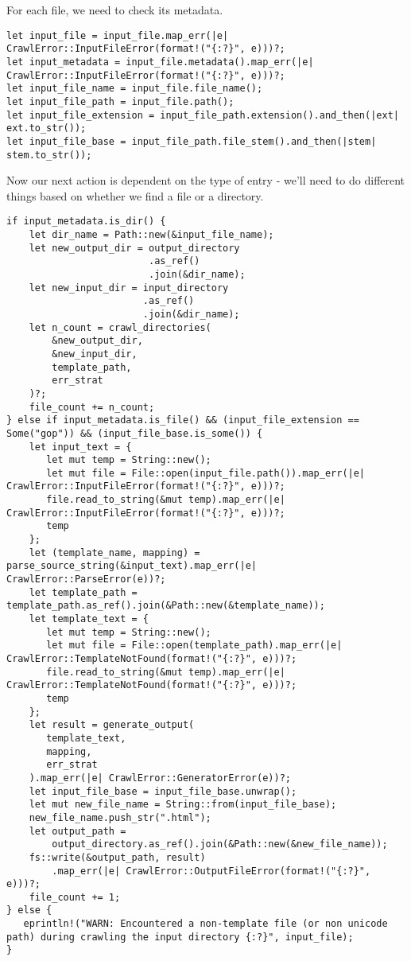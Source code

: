 \documentclass[11pt]{article}
\begin{document}
For each file, we need to check its metadata.
\begin{verbatim}
let input_file = input_file.map_err(|e| CrawlError::InputFileError(format!("{:?}", e)))?;
let input_metadata = input_file.metadata().map_err(|e| CrawlError::InputFileError(format!("{:?}", e)))?;
let input_file_name = input_file.file_name();
let input_file_path = input_file.path();
let input_file_extension = input_file_path.extension().and_then(|ext| ext.to_str());
let input_file_base = input_file_path.file_stem().and_then(|stem| stem.to_str());
\end{verbatim}

Now our next action is dependent on the type of entry - we'll need to do different things based on whether we find a file or a directory.
\begin{verbatim}
if input_metadata.is_dir() {
    let dir_name = Path::new(&input_file_name);
    let new_output_dir = output_directory
                         .as_ref()
                         .join(&dir_name);
    let new_input_dir = input_directory
                        .as_ref()
                        .join(&dir_name);
    let n_count = crawl_directories(
        &new_output_dir, 
        &new_input_dir, 
        template_path, 
        err_strat
    )?;
    file_count += n_count;
} else if input_metadata.is_file() && (input_file_extension == Some("gop")) && (input_file_base.is_some()) {
    let input_text = {
       let mut temp = String::new();
       let mut file = File::open(input_file.path()).map_err(|e| CrawlError::InputFileError(format!("{:?}", e)))?;
       file.read_to_string(&mut temp).map_err(|e| CrawlError::InputFileError(format!("{:?}", e)))?;
       temp
    };
    let (template_name, mapping) = parse_source_string(&input_text).map_err(|e| CrawlError::ParseError(e))?;
    let template_path = template_path.as_ref().join(&Path::new(&template_name));
    let template_text = {
       let mut temp = String::new();
       let mut file = File::open(template_path).map_err(|e| CrawlError::TemplateNotFound(format!("{:?}", e)))?;
       file.read_to_string(&mut temp).map_err(|e| CrawlError::TemplateNotFound(format!("{:?}", e)))?;
       temp
    };
    let result = generate_output(
       template_text, 
       mapping, 
       err_strat
    ).map_err(|e| CrawlError::GeneratorError(e))?;
    let input_file_base = input_file_base.unwrap();
    let mut new_file_name = String::from(input_file_base);
    new_file_name.push_str(".html");
    let output_path = 
        output_directory.as_ref().join(&Path::new(&new_file_name));
    fs::write(&output_path, result)
        .map_err(|e| CrawlError::OutputFileError(format!("{:?}", e)))?;
    file_count += 1;
} else {
   eprintln!("WARN: Encountered a non-template file (or non unicode path) during crawling the input directory {:?}", input_file);
}
\end{verbatim}
\end{document}
